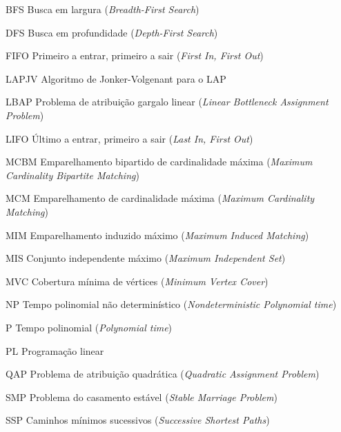 \begin{siglas}
    \item[BFS] Busca em largura (\textit{Breadth-First Search})
    \item[DFS] Busca em profundidade (\textit{Depth-First Search})
    \item[FIFO] Primeiro a entrar, primeiro a sair (\textit{First In, First Out})
    \item[LAPJV] Algoritmo de Jonker-Volgenant para o LAP
    \item[LBAP] Problema de atribuição gargalo linear (\textit{Linear Bottleneck Assignment Problem})
    \item[LIFO] Último a entrar, primeiro a sair (\textit{Last In, First Out})
    \item[MCBM] Emparelhamento bipartido de cardinalidade máxima (\textit{Maximum Cardinality Bipartite Matching})
    \item[MCM] Emparelhamento de cardinalidade máxima (\textit{Maximum Cardinality Matching})
    \item[MIM] Emparelhamento induzido máximo (\textit{Maximum Induced Matching})
    \item[MIS] Conjunto independente máximo (\textit{Maximum Independent Set})
    \item[MVC] Cobertura mínima de vértices (\textit{Minimum Vertex Cover})
    \item[NP] Tempo polinomial não determinístico (\textit{Nondeterministic Polynomial time})
    \item[P] Tempo polinomial (\textit{Polynomial time})
    \item[PL] Programação linear
    \item[QAP] Problema de atribuição quadrática (\textit{Quadratic Assignment Problem})
    \item[SMP] Problema do casamento estável (\textit{Stable Marriage Problem})
    \item[SSP] Caminhos mínimos sucessivos (\textit{Successive Shortest Paths})
\end{siglas}
